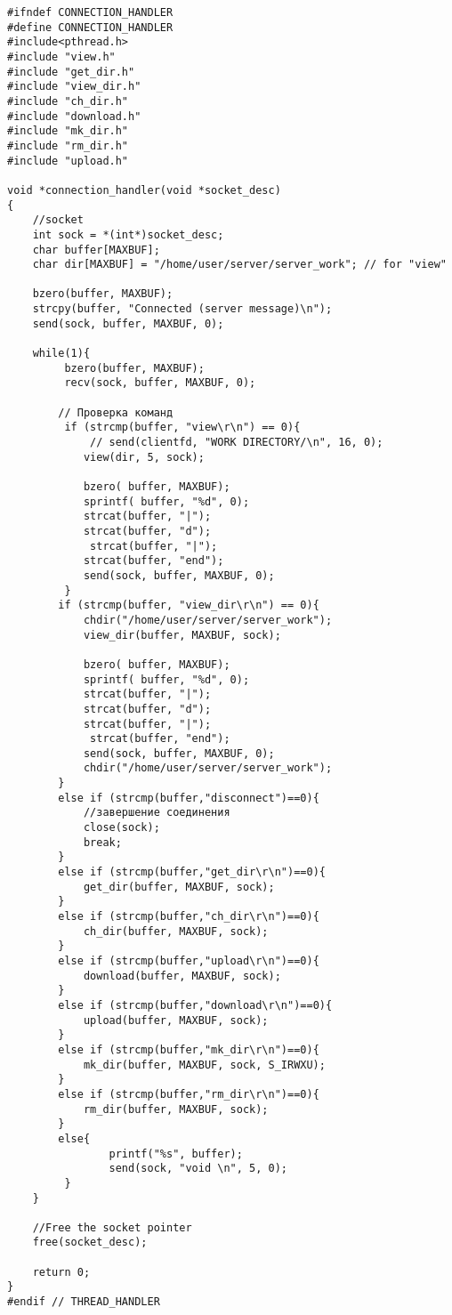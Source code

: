 \documentclass[12pt,a4paper]{report}
\begin{document}
\begin{lstlisting}
#ifndef CONNECTION_HANDLER
#define CONNECTION_HANDLER
#include<pthread.h>
#include "view.h"
#include "get_dir.h"
#include "view_dir.h"
#include "ch_dir.h"
#include "download.h"
#include "mk_dir.h"
#include "rm_dir.h"
#include "upload.h"

void *connection_handler(void *socket_desc)
{
    //socket
    int sock = *(int*)socket_desc;
    char buffer[MAXBUF];
    char dir[MAXBUF] = "/home/user/server/server_work"; // for "view"

    bzero(buffer, MAXBUF);
    strcpy(buffer, "Connected (server message)\n");
    send(sock, buffer, MAXBUF, 0);

    while(1){
         bzero(buffer, MAXBUF);
         recv(sock, buffer, MAXBUF, 0);

        // Проверка команд
         if (strcmp(buffer, "view\r\n") == 0){
             // send(clientfd, "WORK DIRECTORY/\n", 16, 0);
            view(dir, 5, sock);

            bzero( buffer, MAXBUF);
            sprintf( buffer, "%d", 0);
            strcat(buffer, "|");
            strcat(buffer, "d");
             strcat(buffer, "|");
            strcat(buffer, "end");
            send(sock, buffer, MAXBUF, 0);
         }
        if (strcmp(buffer, "view_dir\r\n") == 0){
            chdir("/home/user/server/server_work");
            view_dir(buffer, MAXBUF, sock);

            bzero( buffer, MAXBUF);
            sprintf( buffer, "%d", 0);
            strcat(buffer, "|");
            strcat(buffer, "d");
            strcat(buffer, "|");
             strcat(buffer, "end");
            send(sock, buffer, MAXBUF, 0);
            chdir("/home/user/server/server_work");
        }
        else if (strcmp(buffer,"disconnect")==0){
            //завершение соединения
            close(sock);
            break;
        }
        else if (strcmp(buffer,"get_dir\r\n")==0){
            get_dir(buffer, MAXBUF, sock);
        }
        else if (strcmp(buffer,"ch_dir\r\n")==0){
            ch_dir(buffer, MAXBUF, sock);
        }
        else if (strcmp(buffer,"upload\r\n")==0){
            download(buffer, MAXBUF, sock);
        }
        else if (strcmp(buffer,"download\r\n")==0){
            upload(buffer, MAXBUF, sock);
        }
        else if (strcmp(buffer,"mk_dir\r\n")==0){
            mk_dir(buffer, MAXBUF, sock, S_IRWXU);
        }
        else if (strcmp(buffer,"rm_dir\r\n")==0){
            rm_dir(buffer, MAXBUF, sock);
        }
        else{
                printf("%s", buffer);
                send(sock, "void \n", 5, 0);
         }
    }

    //Free the socket pointer
    free(socket_desc);

    return 0;
}
#endif // THREAD_HANDLER
\end{lstlisting}
\end{document}
